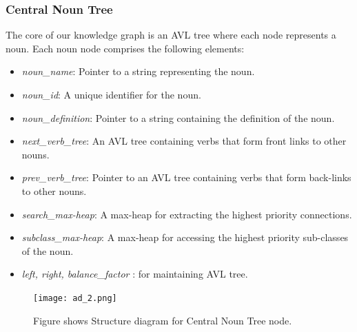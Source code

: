 \documentclass[conference]{IEEEtran}
\begin{document}
\subsubsection{Central Noun Tree}
The core of our knowledge graph is an AVL tree where each node represents a noun. Each noun node comprises the following elements:
\begin{itemize}

    \item \textit{noun\_name}: Pointer to a string representing the noun.
    \item \textit{noun\_id}: A unique identifier for the noun.
    \item \textit{noun\_definition}: Pointer to a string containing the definition of the noun.
    \item \textit{next\_verb\_tree}: An AVL tree containing verbs that form front links to other nouns.
    \item \textit{prev\_verb\_tree}: Pointer to an AVL tree containing verbs that form back-links to other nouns.
    \item \textit{search\_max-heap}: A max-heap for extracting the highest priority connections.
    \item \textit{subclass\_max-heap}: A max-heap for accessing the highest priority sub-classes of the noun.
    \item \textit{left, right, balance\_factor} : for maintaining AVL tree. 
    
\end{itemize}


\begin{figure}[htbp]
\centering
\texttt{[image: ad\_2.png]} %
\caption{Figure shows Structure diagram for Central Noun Tree node.}
\label{fig}
\end{figure}
\end{document}
